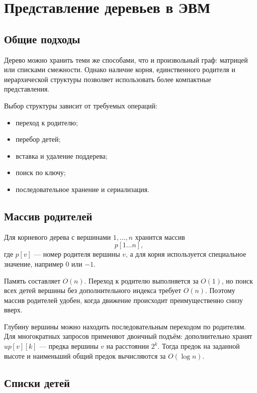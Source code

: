 \section{Представление деревьев в ЭВМ}
\label{sec:tree-representation}

\subsection{Общие подходы}

Дерево можно хранить теми же способами, что и произвольный граф: матрицей или
списками смежности. Однако наличие корня, единственного родителя и иерархической
структуры позволяет использовать более компактные представления.

Выбор структуры зависит от требуемых операций:
\begin{itemize}
    \item переход к родителю;
    \item перебор детей;
    \item вставка и удаление поддерева;
    \item поиск по ключу;
    \item последовательное хранение и сериализация.
\end{itemize}

\subsection{Массив родителей}

Для корневого дерева с вершинами $1,\ldots,n$ хранится массив
\[
    p[1\ldots n],
\]
где $p[v]$ --- номер родителя вершины $v$, а для корня используется специальное
значение, например $0$ или $-1$.

Память составляет $O(n)$. Переход к родителю выполняется за $O(1)$, но поиск
всех детей вершины без дополнительного индекса требует $O(n)$. Поэтому массив
родителей удобен, когда движение происходит преимущественно снизу вверх.

Глубину вершины можно находить последовательным переходом по родителям. Для
многократных запросов применяют двоичный подъём: дополнительно хранят
$up[v][k]$ --- предка вершины $v$ на расстоянии $2^k$. Тогда предок на заданной
высоте и наименьший общий предок вычисляются за $O(\log n)$.

\subsection{Списки детей}

